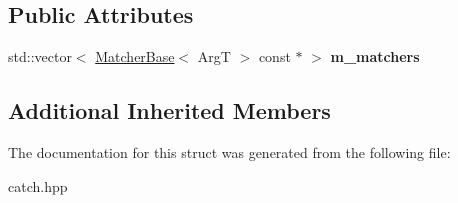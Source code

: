 \subsection*{Public Attributes}
\begin{DoxyCompactItemize}
\item 
\mbox{\label{struct_catch_1_1_matchers_1_1_impl_1_1_match_all_of_a98d6a2611f195a4a5c49f92fd877be9a}} 
std\+::vector$<$ \mbox{\hyperlink{struct_catch_1_1_matchers_1_1_impl_1_1_matcher_base}{Matcher\+Base}}$<$ ArgT $>$ const  $\ast$ $>$ {\bfseries m\+\_\+matchers}
\end{DoxyCompactItemize}
\subsection*{Additional Inherited Members}


The documentation for this struct was generated from the following file\+:\begin{DoxyCompactItemize}
\item 
catch.\+hpp\end{DoxyCompactItemize}
